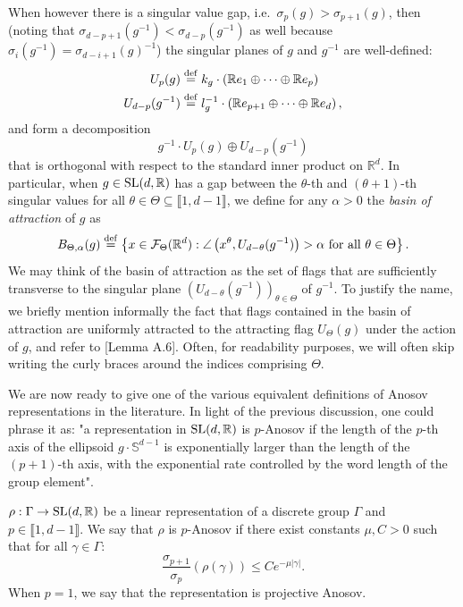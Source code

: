 \documentclass{report}
\begin{document}
When however there is a singular value gap, i.e.\ $\sigma_p(g) > \sigma_{p+1}(g)$, then (noting that $\sigma_{d-p+1}(g^{-1}) < \sigma_{d-p}(g^{-1})$ as well because $\sigma_i(g^{-1}) = \sigma_{d-i + 1}(g)^{-1}$) the singular planes of $g$ and $g^{-1}$ are well-defined:
\begin{align*}
    U_p(g) &\overset{\mathrm{def}}{=} k_g \cdot \left(\mathbb R e_1 \oplus \cdots \oplus \mathbb R e_p\right)\\
    U_{d-p}(g^{-1}) &\overset{\mathrm{def}}{=} l_g^{-1} \cdot \left(\mathbb R e_{p+1} \oplus \cdots \oplus \mathbb R e_d \right),
\end{align*}
and form a decomposition
\[
    g^{-1} \cdot U_p(g) \oplus U_{d-p}(g^{-1})
\]
that is orthogonal with respect to the standard inner product on $\mathbb R^d$.
In particular, when $g \in \operatorname{{\mathrm{SL}}}(d, \mathbb R)$ has a gap between the $\theta$-th and $(\theta+1)$-th singular values for all $\theta \in \Theta \subseteq \llbracket 1, d-1 \rrbracket$, we define for any $\alpha > 0$ the \emph{basin of attraction} of $g$ as
\[
B_{\Theta, \alpha}(g) \overset{\mathrm{def}}{=} \left\{ x \in \mathcal F_{\Theta}(\mathbb R^d) : \angle \left(x^\theta, U_{d-\theta}(g^{-1})\right) > \alpha \text{ for all } \theta \in \Theta \right\}.
\]
We may think of the basin of attraction as the set of flags that are sufficiently transverse to the singular plane $\left(U_{d-\theta}(g^{-1})\right)_{\theta \in \Theta}$ of $g^{-1}$.
To justify the name, we briefly mention informally the fact that flags contained in the basin of attraction are uniformly attracted to the attracting flag $U_{\Theta}(g)$ under the action of $g$, and refer to \cite{bochi2019anosov}[Lemma A.6].
Often, for readability purposes, we will often skip writing the curly braces around the indices comprising $\Theta$.

We are now ready to give one of the various equivalent definitions of Anosov representations in the literature.
In light of the previous discussion, one could phrase it as: "a representation in $\operatorname{{\mathrm{SL}}}(d, \mathbb R)$ is $p$-Anosov if the length of the $p$-th axis of the ellipsoid $g \cdot \mathbb S^{d-1}$ is exponentially larger than the length of the $(p+1)$-th axis, with the exponential rate controlled by the word length of the group element". 
\begin{definition}\label{def:anosov}
    $\rho: \Gamma \to \operatorname{{\mathrm{SL}}}(d, \mathbb R)$ be a linear representation of a discrete group $\Gamma$ and $p \in \llbracket 1, d-1 \rrbracket$.
    We say that $\rho$ is $p$-Anosov if there exist constants $\mu, C>0$ such that for all $\gamma \in \Gamma$:
    \[
        \frac{\sigma_{p+1}}{\sigma_p}(\rho(\gamma)) \leq C e^{-\mu |\gamma|}.
    \]
    When $p=1$, we say that the representation is projective Anosov.
\end{definition}
\end{document}

